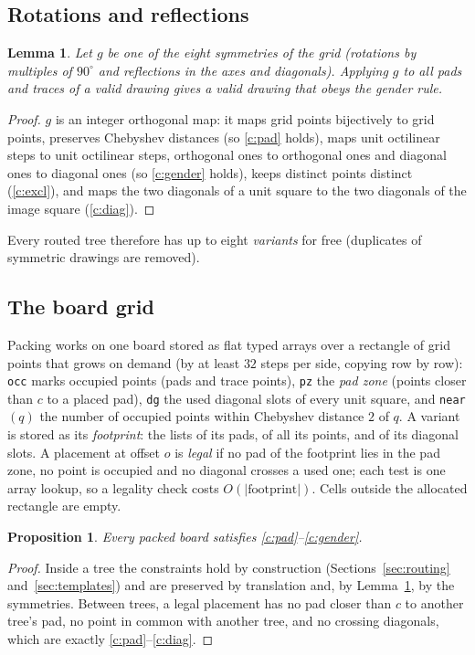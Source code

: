 \documentclass[11pt,a4paper]{article}
\newtheorem{proposition}{Proposition}
\newtheorem{lemma}{Lemma}
\theoremstyle{remark}
\begin{document}
\subsection{Rotations and reflections}
\begin{lemma}\label{lem:d8}
Let $g$ be one of the eight symmetries of the grid (rotations by multiples of $90^\circ$ and reflections in the axes
and diagonals). Applying $g$ to all pads and traces of a valid drawing gives a valid drawing that obeys the gender rule.
\end{lemma}
\begin{proof}
$g$ is an integer orthogonal map: it maps grid points bijectively to grid points, preserves Chebyshev distances
(so \ref{c:pad} holds), maps unit octilinear steps to unit octilinear steps, orthogonal ones to orthogonal ones and
diagonal ones to diagonal ones (so \ref{c:gender} holds), keeps distinct points distinct (\ref{c:excl}), and maps the
two diagonals of a unit square to the two diagonals of the image square (\ref{c:diag}).
\end{proof}
Every routed tree therefore has up to eight \emph{variants} for free (duplicates of symmetric drawings are removed).

\subsection{The board grid}
Packing works on one board stored as flat typed arrays over a rectangle of grid points that grows on demand (by at
least $32$ steps per side, copying row by row): \texttt{occ} marks occupied points (pads and trace points),
\texttt{pz} the \emph{pad zone} (points closer than $c$ to a placed pad), \texttt{dg} the used diagonal slots of every
unit square, and \texttt{near}$(q)$ the number of occupied points within Chebyshev distance $2$ of $q$. A variant is
stored as its \emph{footprint}: the lists of its pads, of all its points, and of its diagonal slots. A placement at
offset $o$ is \emph{legal} if no pad of the footprint lies in the pad zone, no point is occupied and no diagonal
crosses a used one; each test is one array lookup, so a legality check costs $O(|\text{footprint}|)$. Cells outside
the allocated rectangle are empty.

\begin{proposition}
Every packed board satisfies \ref{c:pad}--\ref{c:gender}.
\end{proposition}
\begin{proof}
Inside a tree the constraints hold by construction (Sections~\ref{sec:routing} and~\ref{sec:templates}) and are
preserved by translation and, by Lemma~\ref{lem:d8}, by the symmetries. Between trees, a legal placement has no pad
closer than $c$ to another tree's pad, no point in common with another tree, and no crossing diagonals, which are
exactly \ref{c:pad}--\ref{c:diag}.
\end{proof}
\end{document}
